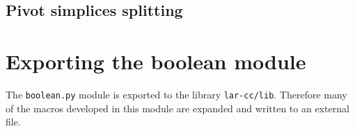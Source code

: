 \documentclass[11pt,oneside]{article}	%
\begin{document}
\subsection{Pivot simplices splitting}
\section{Exporting the boolean module}

The \texttt{boolean.py} module is exported to the library \texttt{lar-cc/lib}. Therefore many of the macros developed in this module are expanded and written to an external file.
\end{document}
